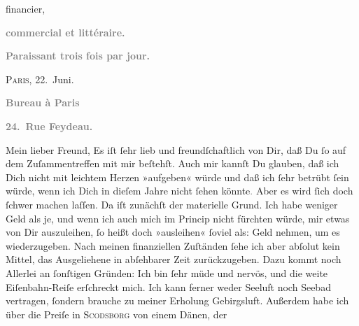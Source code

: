 \begin{ledgroupsized}[t]{13cm}
\begin{otherlanguage}{french}
{{                        financier,}}\end{otherlanguage}\pend
           \pstart
           \begin{otherlanguage}{french}\textcolor{gray}{\textbf{commercial et littéraire.}}\end{otherlanguage}\pend
           \pstart
           \begin{otherlanguage}{french}\textcolor{gray}{\textbf{\textbf{Paraissant trois fois par jour.}}}\end{otherlanguage}\hfill \textsc{Paris}, 22. Juni.\pend
           \pstart
           \begin{otherlanguage}{french}\textcolor{gray}{\textbf{\textbf{Bureau à Paris}}}\end{otherlanguage}\pend
           \pstart
           \begin{otherlanguage}{french}\textcolor{gray}{\textbf{\textbf{24. Rue Feydeau.}}}\end{otherlanguage}\pend
           \pstart{}Mein lieber Freund,\pend\pstart
           Es iſt ſehr lieb und freundſchaftlich von Dir, daß Du ſo auf dem Zuſammentreffen mit
               mir beſtehſt. Auch mir kannſt Du glauben, daß ich Dich nicht mit leichtem Herzen
               »aufgeben« würde und daß ich ſehr betrübt ſein würde, wenn ich Dich in dieſem Jahre
               nicht ſehen könnte\textcolor{gray}{.} Aber es wird ſich doch ſchwer machen laſſen.
               Da iſt zunächſt der materielle Grund. Ich habe weniger Geld als je, {\pb}und wenn ich auch mich im Princip nicht  fürchten würde, mir etwas von Dir auszuleihen, ſo
               heißt doch »ausleihen« ſoviel\strikeout{,} als: Geld nehmen, um
               es wiederzugeben. Nach meinen \label{T_L02778_1v}\label{T_L02778_1h} finanziellen Zuſtänden ſehe ich aber abſolut
               kein Mittel,  das Ausgeliehene in abſehbarer Zeit
               zurückzugeben. Dazu kommt noch Allerlei an ſonſtigen Gründen: Ich bin ſehr müde und
               nervös, und die weite Eiſenbahn-Reiſe erſchreckt mich. {\pb}Ich kann ferner weder Seeluft noch  Seebad vertragen, ſondern brauche zu meiner Erholung Gebirgsluft. Außerdem
               habe ich über die Preiſe in \textsc{Scodsborg} von einem Dänen, der

\end{ledgroupsized}

